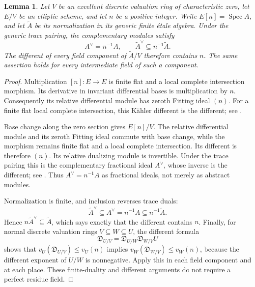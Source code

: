 \documentclass[11pt,a4paper]{article}
\newtheorem{lemma}[theorem]{Lemma}
\theoremstyle{definition}
\begin{document}
\begin{lemma}\label{lem:torsion-different}
Let $V$ be an excellent discrete valuation ring of characteristic zero,
let $E/V$ be an elliptic scheme, and let $n$ be a positive integer.
Write $E[n]=\operatorname{Spec} A$, and let $\widetilde A$ be its
normalization in its generic finite \'etale algebra. Under the generic
trace pairing, the complementary modules satisfy
\[
 A^\vee=n^{-1}A,\qquad
 \widetilde A^\vee\subseteq n^{-1}\widetilde A.
\]
The different of every field component of $\widetilde A/V$ therefore
contains $n$. The same assertion holds for every intermediate field
of such a component.
\end{lemma}
\begin{proof}
Multiplication $[n]:E\to E$ is finite flat and a local complete
intersection morphism. Its derivative in invariant differential bases
is multiplication by $n$. Consequently its relative differential
module has zeroth Fitting ideal $(n)$. For a finite flat local complete
intersection, this K\"ahler different is the different; see
\cite[Tag~0BWB, Lemmas~49.12.3 and~49.12.6]{Stacks}.

Base change along the zero section gives $E[n]/V$. The relative
differential module and its zeroth Fitting ideal commute with base
change, while the morphism remains finite flat and a local complete
intersection. Its different is therefore $(n)$. Its relative
dualizing module is invertible. Under the trace pairing this is the
complementary fractional ideal $A^\vee$, whose inverse is the different;
see \cite[Tag~0BW0, Lemmas~49.8.2--49.8.3, and Tag~0BWB,
Lemma~49.12.4]{Stacks}. Thus $A^\vee=n^{-1}A$ as fractional ideals,
not merely as abstract modules.

Normalization is finite, and inclusion reverses trace duals:
\[
 \widetilde A^\vee\subseteq A^\vee=n^{-1}A
                              \subseteq n^{-1}\widetilde A.
\]
Hence $n\widetilde A^\vee\subseteq\widetilde A$, which says exactly
that the different contains $n$. Finally, for normal discrete
valuation rings $V\subseteq W\subseteq U$, the different formula
\[
 \mathfrak D_{U/V}=\mathfrak D_{U/W}\mathfrak D_{W/V}U
\]
shows that $v_U(\mathfrak D_{U/V})\le v_U(n)$ implies
$v_W(\mathfrak D_{W/V})\le v_W(n)$, because the different exponent
of $U/W$ is nonnegative. Apply this in each field component and
at each place. These finite-duality and different arguments do not
require a perfect residue field.
\end{proof}
\end{document}
